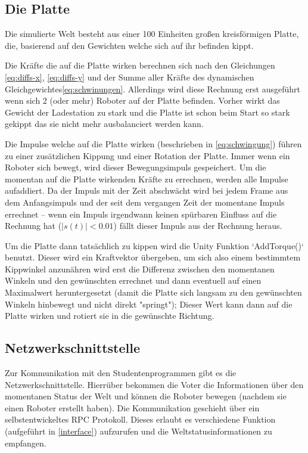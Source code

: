 \subsection{Die Platte}\label{plate}
Die simulierte Welt besteht aus einer 100 Einheiten gro{\ss}en kreisf{\"{o}}rmigen Platte, die, basierend auf den Gewichten welche sich auf ihr befinden kippt.

Die Kr{\"{a}}fte die auf die Platte wirken berechnen sich nach den Gleichungen \ref{eq:diffs-x}, \ref{eq:diffs-y} und der Summe aller Kr{\"{a}}fte des
dynamischen Gleichgewichtes\ref{eq:schwinungen}.
Allerdings wird diese Rechnung erst ausgef{\"{u}}hrt wenn sich 2 (oder mehr) Roboter auf der Platte befinden. Vorher wirkt das Gewicht der Ladestation zu
stark und die Platte ist schon beim Start so stark gekippt das sie nicht mehr ausbalanciert werden kann.

Die Impulse welche auf die Platte wirken (beschrieben in \ref{eq:schwingung}) f{\"{u}}hren zu einer zus{\"{a}}tzlichen Kippung und einer Rotation der Platte.
Immer wenn ein Roboter sich bewegt, wird dieser Bewegungsimpuls gespeichert. Um die momentan auf die Platte wirkenden Kr{\"{a}}fte zu errechnen, werden alle
Impulse aufaddiert. Da der Impuls mit der Zeit abschw{\"{a}}cht wird bei jedem Frame aus dem Anfangsimpuls und der seit dem vergangen Zeit der momentane
Impuls errechnet -- wenn ein Impuls irgendwann keinen sp{\"{u}}rbaren Einfluss auf die Rechnung hat ($ |s(t)| < 0.01$) f{\"{a}}llt dieser Impuls aus der
Rechnung heraus.

Um die Platte dann tats{\"{a}}chlich zu kippen wird die Unity Funktion `AddTorque()` benutzt. Dieser wird ein Kraftvektor {\"{u}}bergeben, um sich also einem
bestimmtem Kippwinkel anzun{\"{a}}hren wird erst die Differenz zwischen den momentanen Winkeln und den gew{\"{u}}nschten errechnet und dann eventuell auf
einen Maximalwert heruntergesetzt (damit die Platte sich langsam zu den gew{\"{u}}nschten Winkeln hinbewegt und nicht direkt "springt"); Dieser Wert kann dann
auf die Platte wirken und rotiert sie in die gew{\"{u}}nschte Richtung.

\subsection{Netzwerkschnittstelle}
Zur Kommunikation mit den Studentenprogrammen gibt es die Netzwerkschnittstelle. Hierr{\"{u}}ber bekommen die Voter die Informationen {\"{u}}ber den momentanen
Status der Welt und k{\"{o}}nnen die Roboter bewegen (nachdem sie einen Roboter erstellt haben). Die Kommunikation geschieht {\"{u}}ber ein selbstentwickeltes
RPC Protokoll. Dieses erlaubt es verschiedene Funktion (aufgef{\"{u}}hrt in \ref{interface}) aufzurufen und die Weltstatusinformationen zu empfangen.

